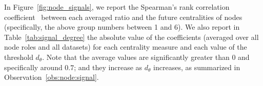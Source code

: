 In Figure~\ref{fig:node_signals}, we report the Spearman's rank correlation coefficient~\cite{zwillinger1999crc} between each averaged ratio and the future centralities of nodes (specifically, the above group numbers between 1 and 6).
We also report in Table~\ref{tab:signal_degree} the absolute value of the coefficients (averaged over all node roles and all datasets) for each centrality measure and each value of the threshold $d_\theta$. Note that the average values are significantly greater than $0$ and specifically around $0.7$; and they
increase as $d_\theta$ increases, as summarized in Observation~\ref{obs:node:signal}.
%


\noindent{}
\vspace{0.5mm}



